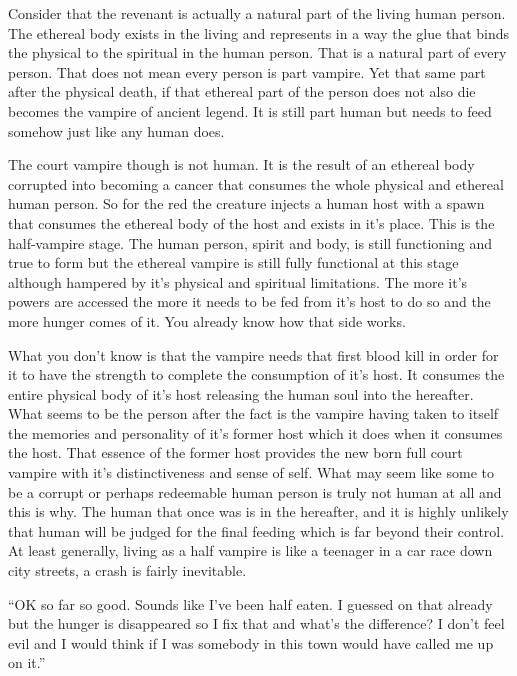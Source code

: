 Consider that the revenant is actually a natural part of the living human person. The ethereal body exists in the living and represents in a way the glue that binds the physical to the spiritual in the human person. That is a natural part of every person. That does not mean every person is part vampire. Yet that same part after the physical death, if that ethereal part of the person does not also die becomes the vampire of ancient legend. It is still part human but needs to feed somehow just like any human does.

The court vampire though is not human. It is the result of an ethereal body corrupted into becoming a cancer that consumes the whole physical and ethereal human person. So for the red the creature injects a human host with a spawn that consumes the ethereal body of the host and exists in it's place. This is the half-vampire stage. The human person, spirit and body, is still functioning and true to form but the ethereal vampire is still fully functional at this stage although hampered by it's physical and spiritual limitations. The more it's powers are accessed the more it needs to be fed from it's host to do so and the more hunger comes of it. You already know how that side works.

What you don't know is that the vampire needs that first blood kill in order for it to have the strength to complete the consumption of it's host. It consumes the entire physical body of it's host releasing the human soul into the hereafter. What seems to be the person after the fact is the vampire having taken to itself the memories and personality of it's former host which it does when it consumes the host. That essence of the former host provides the new born full court vampire with it's distinctiveness and sense of self. What may seem like some to be a corrupt or perhaps redeemable human person is truly not human at all and this is why. The human that once was is in the hereafter, and it is highly unlikely that human will be judged for the final feeding which is far beyond their control. At least generally, living as a half vampire is like a teenager in a car race down city streets, a crash is fairly inevitable.

``OK so far so good. Sounds like I've been half eaten. I guessed on that already but the hunger is disappeared so I fix that and what's the difference? I don't feel evil and I would think if I was somebody in this town would have called me up on it.''

